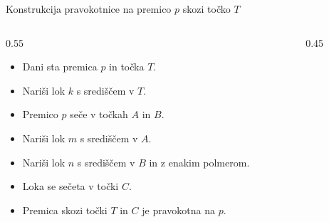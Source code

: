\begin{frame}{Konstrukcija pravokotnice na premico $p$ skozi točko $T$}
	\begin{columns}[c]
		\begin{column}{0.55\textwidth}
		  \begin{itemize}
			 \item<1-> Dani sta premica $p$ in točka $T$.
			 \item<2-> Nariši lok $k$ s središčem v $T$.
			 \item<3-> Premico $p$ seče v točkah $A$ in $B$.
			 \item<4-> Nariši lok $m$ s središčem v $A$.
			 \item<5-> Nariši lok $n$ s središčem v $B$ in z enakim polmerom.
			 \item<6-> Loka se sečeta v točki $C$.
			 \item<7-> Premica skozi točki $T$ in $C$ je pravokotna na $p$.
		  \end{itemize}
		  \end{column}
		  \begin{column}{0.45\textwidth}
\end{column}
\end{columns}
\end{frame}

